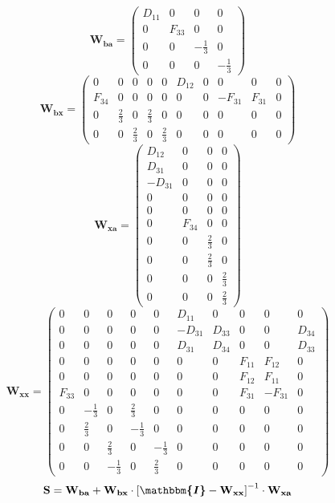 \[ \mathbf{W_{ba}} = \left(\begin{smallmatrix} D_{11} & 0 & 0 & 0 \\ 0
& F_{33} & 0 & 0 \\ 0 & 0 & -\frac{1}{3} & 0 \\ 0 & 0 & 0 &
-\frac{1}{3} \end{smallmatrix}\right) \]
\[ \mathbf{W_{bx}} = \left(\begin{smallmatrix} 0 & 0 & 0 & 0 & 0 &
D_{12} & 0 & 0 & 0 & 0 \\ F_{34} & 0 & 0 & 0 & 0 & 0 & 0 & -F_{31} &
F_{31} & 0 \\ 0 & \frac{2}{3} & 0 & \frac{2}{3} & 0 & 0 & 0 & 0 & 0 &
0 \\ 0 & 0 & \frac{2}{3} & 0 & \frac{2}{3} & 0 & 0 & 0 & 0 & 0
\end{smallmatrix}\right) \]
\[ \mathbf{W_{xa}} = \left(\begin{smallmatrix} D_{12} & 0 & 0 & 0 \\
D_{31} & 0 & 0 & 0 \\ -D_{31} & 0 & 0 & 0 \\ 0 & 0 & 0 & 0 \\ 0 & 0 &
0 & 0 \\ 0 & F_{34} & 0 & 0 \\ 0 & 0 & \frac{2}{3} & 0 \\ 0 & 0 &
\frac{2}{3} & 0 \\ 0 & 0 & 0 & \frac{2}{3} \\ 0 & 0 & 0 & \frac{2}{3}
\end{smallmatrix}\right) \]
\[ \mathbf{W_{xx}} = \left(\begin{smallmatrix} 0 & 0 & 0 & 0 & 0 &
D_{11} & 0 & 0 & 0 & 0 \\ 0 & 0 & 0 & 0 & 0 & -D_{31} & D_{33} & 0 & 0
& D_{34} \\ 0 & 0 & 0 & 0 & 0 & D_{31} & D_{34} & 0 & 0 & D_{33} \\ 0
& 0 & 0 & 0 & 0 & 0 & 0 & F_{11} & F_{12} & 0 \\ 0 & 0 & 0 & 0 & 0 & 0
& 0 & F_{12} & F_{11} & 0 \\ F_{33} & 0 & 0 & 0 & 0 & 0 & 0 & F_{31} &
-F_{31} & 0 \\ 0 & -\frac{1}{3} & 0 & \frac{2}{3} & 0 & 0 & 0 & 0 & 0
& 0 \\ 0 & \frac{2}{3} & 0 & -\frac{1}{3} & 0 & 0 & 0 & 0 & 0 & 0 \\ 0
& 0 & \frac{2}{3} & 0 & -\frac{1}{3} & 0 & 0 & 0 & 0 & 0 \\ 0 & 0 &
-\frac{1}{3} & 0 & \frac{2}{3} & 0 & 0 & 0 & 0 & 0
\end{smallmatrix}\right) \]
\[ \mathbf{S}=\mathbf{W_{ba}}+\mathbf{W_{bx}}\cdot\left[
\boldsymbol{\mathbbm{I}}
-\mathbf{W_{xx}}\right]^{-1}\cdot\mathbf{W_{xa}} \]
